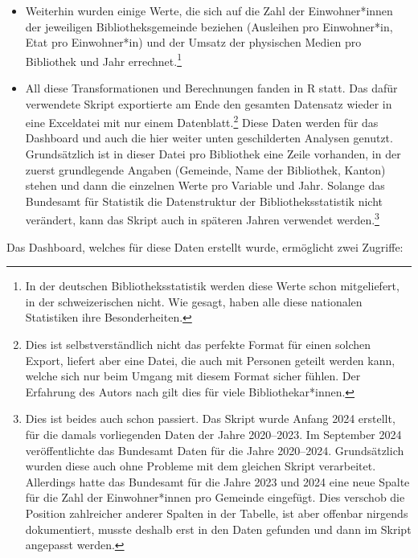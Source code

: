 \documentclass[a4paper,
fontsize=11pt,
oneside,
numbers=noperiodatend,
parskip=half-,
bibliography=totoc,
final
]{scrartcl}
\begin{document}
\begin{itemize}
{    Bundesamt für Statistik (ohne Jahr, a).} oder ländlicher Raum.
\item
  Weiterhin wurden einige Werte, die sich auf die Zahl der
  Einwohner*innen der jeweiligen Bibliotheksgemeinde beziehen (Ausleihen
  pro Einwohner*in, Etat pro Einwohner*in) und der Umsatz der physischen
  Medien pro Bibliothek und Jahr errechnet.\footnote{In der deutschen
    Bibliotheksstatistik werden diese Werte schon mitgeliefert, in der
    schweizerischen nicht. Wie gesagt, haben alle diese nationalen
    Statistiken ihre Besonderheiten.}
\item
  All diese Transformationen und Berechnungen fanden in R statt. Das
  dafür verwendete Skript exportierte am Ende den gesamten Datensatz
  wieder in eine Exceldatei mit nur einem Datenblatt.\footnote{Dies ist
    selbstverständlich nicht das perfekte Format für einen solchen
    Export, liefert aber eine Datei, die auch mit Personen geteilt
    werden kann, welche sich nur beim Umgang mit diesem Format sicher
    fühlen. Der Erfahrung des Autors nach gilt dies für viele
    Bibliothekar*innen.} Diese Daten werden für das Dashboard und auch
  die hier weiter unten geschilderten Analysen genutzt. Grundsätzlich
  ist in dieser Datei pro Bibliothek eine Zeile vorhanden, in der zuerst
  grundlegende Angaben (Gemeinde, Name der Bibliothek, Kanton) stehen
  und dann die einzelnen Werte pro Variable und Jahr. Solange das
  Bundesamt für Statistik die Datenstruktur der Bibliotheksstatistik
  nicht verändert, kann das Skript auch in späteren Jahren verwendet
  werden.\footnote{Dies ist beides auch schon passiert. Das Skript wurde
    Anfang 2024 erstellt, für die damals vorliegenden Daten der Jahre
    2020--2023. Im September 2024 veröffentlichte das Bundesamt Daten
    für die Jahre 2020--2024. Grundsätzlich wurden diese auch ohne
    Probleme mit dem gleichen Skript verarbeitet. Allerdings hatte das
    Bundesamt für die Jahre 2023 und 2024 eine neue Spalte für die Zahl
    der Einwohner*innen pro Gemeinde eingefügt. Dies verschob die
    Position zahlreicher anderer Spalten in der Tabelle, ist aber
    offenbar nirgends dokumentiert, musste deshalb erst in den Daten
    gefunden und dann im Skript angepasst werden.}
\end{itemize}

Das Dashboard, welches für diese Daten erstellt wurde, ermöglicht zwei
Zugriffe:
\end{document}
